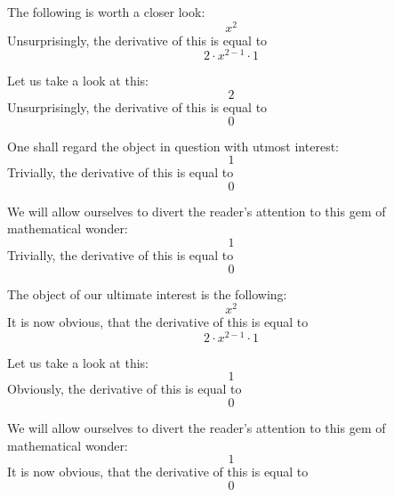 \documentclass{article}
\begin{document}
The following is worth a closer look:
\begin{equation}
x ^{2 } 
\end{equation}
Unsurprisingly, the derivative of this is equal to
\begin{equation}
2 \cdot x ^{2 - 1 } \cdot 1 
\end{equation}

Let us take a look at this:
\begin{equation}
2 
\end{equation}
Unsurprisingly, the derivative of this is equal to
\begin{equation}
0 
\end{equation}

One shall regard the object in question with utmost interest:
\begin{equation}
1 
\end{equation}
Trivially, the derivative of this is equal to
\begin{equation}
0 
\end{equation}

We will allow ourselves to divert the reader's attention to this gem of mathematical wonder:
\begin{equation}
1 
\end{equation}
Trivially, the derivative of this is equal to
\begin{equation}
0 
\end{equation}

The object of our ultimate interest is the following:
\begin{equation}
x ^{2 } 
\end{equation}
It is now obvious, that the derivative of this is equal to
\begin{equation}
2 \cdot x ^{2 - 1 } \cdot 1 
\end{equation}

Let us take a look at this:
\begin{equation}
1 
\end{equation}
Obviously, the derivative of this is equal to
\begin{equation}
0 
\end{equation}

We will allow ourselves to divert the reader's attention to this gem of mathematical wonder:
\begin{equation}
1 
\end{equation}
It is now obvious, that the derivative of this is equal to
\begin{equation}
0 
\end{equation}
\end{document}
